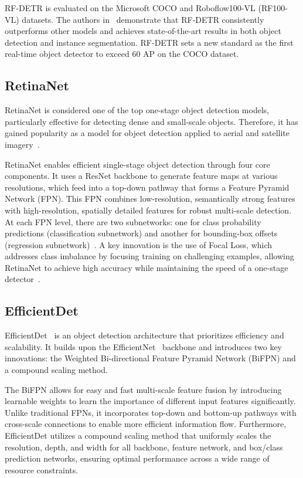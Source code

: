 \documentclass{article}
\begin{document}
RF-DETR is evaluated on the Microsoft COCO and Roboflow100-VL (RF100-VL) datasets. The authors in~\cite{rf-detr} demonstrate that RF-DETR consistently outperforms other models and achieves state-of-the-art results in both object detection and instance segmentation. RF-DETR sets a new standard as the first real-time object detector to exceed 60 AP on the COCO dataset.

\subsection{RetinaNet}
RetinaNet is considered one of the top one-stage object detection models, particularly effective for detecting dense and small-scale objects. Therefore, it has gained popularity as a model for object detection applied to aerial and satellite imagery~\cite{retinanet}.

RetinaNet enables efficient single-stage object detection through four core components. It uses a ResNet backbone to generate feature maps at various resolutions, which feed into a top-down pathway that forms a Feature Pyramid Network (FPN). This FPN combines low-resolution, semantically strong features with high-resolution, spatially detailed features for robust multi-scale detection. At each FPN level, there are two subnetworks: one for class probability predictions (classification subnetwork) and another for bounding-box offsets (regression subnetwork)~\cite{retinanet}. A key innovation is the use of Focal Loss, which addresses class imbalance by focusing training on challenging examples, allowing RetinaNet to achieve high accuracy while maintaining the speed of a one-stage detector~\cite{viso_retinanet}.


\subsection{EfficientDet}
EfficientDet~\cite{efficientdet} is an object detection architecture that prioritizes efficiency and scalability. It builds upon the EfficientNet~\cite{efficientnet} backbone and introduces two key innovations: the Weighted Bi-directional Feature Pyramid Network (BiFPN) and a compound scaling method.

The BiFPN allows for easy and fast multi-scale feature fusion by introducing learnable weights to learn the importance of different input features significantly. Unlike traditional FPNs, it incorporates top-down and bottom-up pathways with cross-scale connections to enable more efficient information flow. Furthermore, EfficientDet utilizes a compound scaling method that uniformly scales the resolution, depth, and width for all backbone, feature network, and box/class prediction networks, ensuring optimal performance across a wide range of resource constraints.
\end{document}
